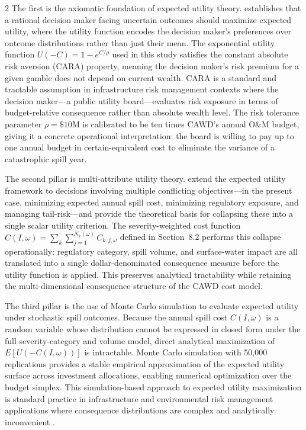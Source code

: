 \documentclass[10pt]{article}
\begin{document}
\begin{multicols}{2}
The first is the axiomatic foundation of expected utility theory.
\citet{howard1966} establishes that a rational decision maker facing
uncertain outcomes should maximize expected utility, where the utility
function encodes the decision maker's preferences over outcome
distributions rather than just their mean. The exponential utility
function $U(-C) = 1 - e^{C/\rho}$ used in this study satisfies the
constant absolute risk aversion (CARA) property, meaning the decision
maker's risk premium for a given gamble does not depend on current
wealth. CARA is a standard and tractable assumption in infrastructure
risk management contexts where the decision maker---a public utility
board---evaluates risk exposure in terms of budget-relative consequence
rather than absolute wealth level. The risk tolerance parameter
$\rho = \$10$M is calibrated to be ten times CAWD's annual O\&M
budget, giving it a concrete operational interpretation: the board
is willing to pay up to one annual budget in certain-equivalent cost
to eliminate the variance of a catastrophic spill year.
 
The second pillar is multi-attribute utility theory.
\citet{keeney1976} extend the expected utility framework to decisions
involving multiple conflicting objectives---in the present case,
minimizing expected annual spill cost, minimizing regulatory exposure,
and managing tail-risk---and provide the theoretical basis for
collapsing these into a single scalar utility criterion. The
severity-weighted cost function $C(I,\omega) = \sum_k
\sum_{j=1}^{N_k(\omega)} C_{k,j,\omega}$ defined in Section~8.2
performs this collapse operationally: regulatory category, spill
volume, and surface-water impact are all translated into a single
dollar-denominated consequence measure before the utility function is
applied. This preserves analytical tractability while retaining the
multi-dimensional consequence structure of the CAWD cost model.
 
The third pillar is the use of Monte Carlo simulation to evaluate
expected utility under stochastic spill outcomes. Because the annual
spill cost $C(I,\omega)$ is a random variable whose distribution
cannot be expressed in closed form under the full severity-category
and volume model, direct analytical maximization of
$E[U(-C(I,\omega))]$ is intractable. Monte Carlo simulation with
50{,}000 replications provides a stable empirical approximation of
the expected utility surface across investment allocations, enabling
numerical optimization over the budget simplex. This
simulation-based approach to expected utility maximization is
standard practice in infrastructure and environmental risk management
applications where consequence distributions are complex and
analytically inconvenient \citep{johnson2021}.
 

\end{multicols}
\end{document}
